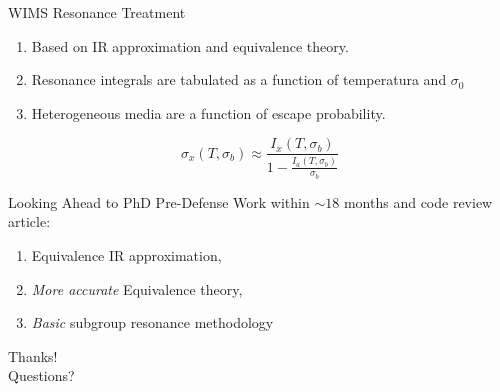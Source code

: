 \documentclass[sans,mathserif,aspectratio=169, 10pt]{beamer}
\begin{document}
\begin{frame}{WIMS Resonance Treatment}
\begin{enumerate}[<+->]
\item Based on IR approximation and equivalence theory.
\item Resonance integrals are tabulated as a function of temperatura and $\sigma_0$
\item Heterogeneous media are a function of escape probability.
\end{enumerate}
\pause
\begin{equation}
\sigma_x (T, \sigma_b) \approx \frac{I_x(T, \sigma_b)}{1 - \frac{I_a (T, \sigma_b)}{\sigma_b}}
\end{equation}
\end{frame}

\begin{frame}{Looking Ahead to PhD Pre-Defense}
Work within $\sim18$ months and code review article:
\begin{enumerate}[<+->]
\item Equivalence IR approximation,
\item \emph{More accurate} Equivalence theory,
\item \emph{Basic} subgroup resonance methodology 
\end{enumerate}
\end{frame}

\begin{frame}
\centering
\Huge
Thanks! \\
Questions?
\end{frame}
\end{document}

